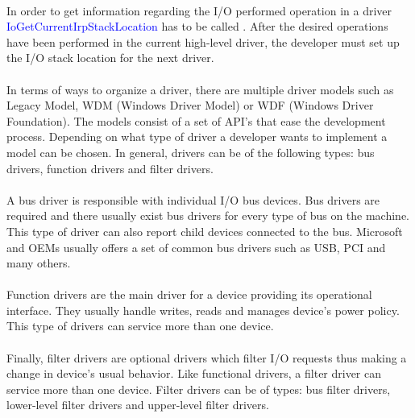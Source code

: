 		\paragraph{}
	   	In order to get information regarding the I/O performed operation in a  driver \textcolor{blue}{IoGetCurrentIrpStackLocation} has to be called . After the desired operations have been performed in the current high-level driver, the developer   must set up the I/O stack location for the next driver\cite{MSDNIOStackLocations}.
	   
	   	\paragraph{}
	   	In terms of ways to organize a driver, there are multiple driver models such as Legacy Model, WDM (Windows Driver Model) or WDF (Windows Driver Foundation). The models consist of a set of API's that ease the development process. Depending on what type of driver a developer wants to implement a model can be chosen. In general, drivers can be of the following types: bus drivers, function drivers and filter drivers.
	   	
	   	\paragraph{}
	   	A bus driver is responsible with individual I/O bus devices. Bus drivers are required and there usually exist bus drivers for every type of bus on the machine. This type of driver can also report child devices connected to the bus. Microsoft and OEMs usually offers a set of common bus drivers such as USB, PCI and many others\cite{MSDNWDMDrivers}.
	   	
	   	\paragraph{}
	   	Function drivers are the main driver for a device providing its operational interface. They usually handle writes, reads and manages device's power policy. This type of drivers can service more than one device\cite{MSDNWDMDrivers}.
	   
	   	\paragraph{}
	   	Finally, filter drivers are optional drivers which filter I/O requests thus making a change in device's usual behavior. Like functional drivers, a filter driver can service more than one device. Filter drivers can be of types: bus filter drivers, lower-level filter drivers and upper-level filter drivers\cite{MSDNWDMDrivers}.
	   

